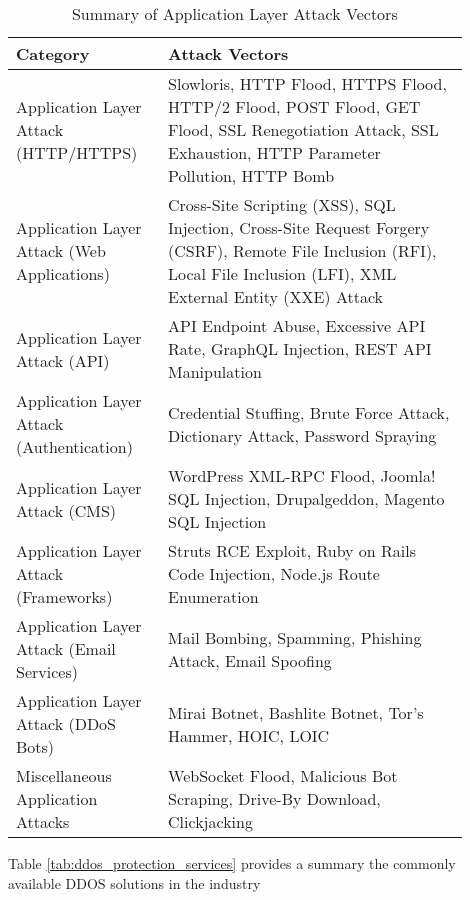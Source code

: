 \begin{table}[!htbp]
\centering
\caption{Summary of Application Layer Attack Vectors}
\begin{tabular}{|p{0.3\linewidth}|p{0.6\linewidth}|}
\hline
\textbf{Category} & \textbf{Attack Vectors} \\
\hline
Application Layer Attack (HTTP/HTTPS) & Slowloris, HTTP Flood, HTTPS Flood, HTTP/2 Flood, POST Flood, GET Flood, SSL Renegotiation Attack, SSL Exhaustion, HTTP Parameter Pollution, HTTP Bomb \\
\hline
Application Layer Attack (Web Applications) & Cross-Site Scripting (XSS), SQL Injection, Cross-Site Request Forgery (CSRF), Remote File Inclusion (RFI), Local File Inclusion (LFI), XML External Entity (XXE) Attack \\
\hline
Application Layer Attack (API) & API Endpoint Abuse, Excessive API Rate, GraphQL Injection, REST API Manipulation \\
\hline
Application Layer Attack (Authentication) & Credential Stuffing, Brute Force Attack, Dictionary Attack, Password Spraying \\
\hline
Application Layer Attack (CMS) & WordPress XML-RPC Flood, Joomla! SQL Injection, Drupalgeddon, Magento SQL Injection \\
\hline
Application Layer Attack (Frameworks) & Struts RCE Exploit, Ruby on Rails Code Injection, Node.js Route Enumeration \\
\hline
Application Layer Attack (Email Services) & Mail Bombing, Spamming, Phishing Attack, Email Spoofing \\
\hline
Application Layer Attack (DDoS Bots) & Mirai Botnet, Bashlite Botnet, Tor's Hammer, HOIC, LOIC \\
\hline
Miscellaneous Application Attacks & WebSocket Flood, Malicious Bot Scraping, Drive-By Download, Clickjacking \\
\hline
\end{tabular}
\label{tab:application_attacks}
\end{table}

Table \ref{tab:ddos_protection_services} provides a summary the commonly available DDOS solutions in the industry

